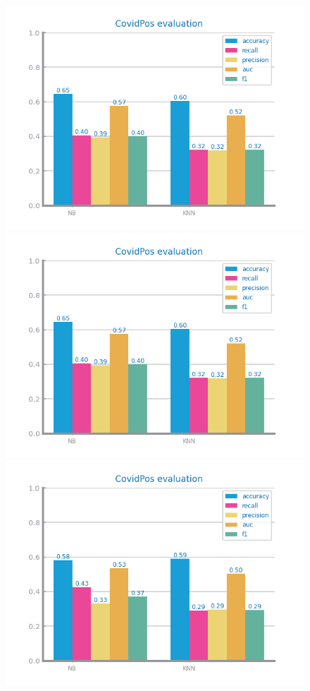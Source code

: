 \documentclass[10pt]{extarticle}
\begin{document}
\begin{figure}[H]
\centering\includegraphics[scale=0.80]{images/dataset1/data_preparation/CovidPos_scaling_treat_MinMax1.png}
\includegraphics[scale=0.80]{images/dataset1/data_preparation/CovidPos_scaling_treat_MinMax2.png}
\includegraphics[scale=0.80]{images/dataset1/data_preparation/CovidPos_scaling_treat_Original.png}

\end{figure}
\end{document}

